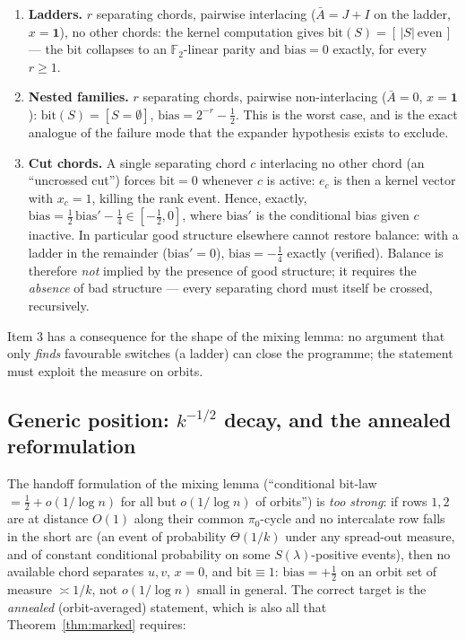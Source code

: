 \begin{enumerate}[leftmargin=2em]
\item \textbf{Ladders.}  $r$ separating chords, pairwise interlacing
($\bar A=J+I$ on the ladder, $x=\mathbf 1$), no other chords: the
kernel computation gives $\mathrm{bit}(S)=[\,|S|\ \text{even}\,]$
--- the bit collapses to an $\mathbb{F}_2$-linear parity and
$\mathrm{bias}=0$ exactly, for every $r\ge1$.
\item \textbf{Nested families.}  $r$ separating chords, pairwise
non-interlacing ($\bar A=0$, $x=\mathbf 1$):
$\mathrm{bit}(S)=[S=\emptyset]$, $\mathrm{bias}=2^{-r}-\tfrac12$.
This is the worst case, and is the exact analogue of the failure
mode that the expander hypothesis exists to exclude.
\item \textbf{Cut chords.}  A single separating chord $c$ interlacing
no other chord (an ``uncrossed cut'') forces $\mathrm{bit}=0$ whenever
$c$ is active: $e_c$ is then a kernel vector with $x_c=1$, killing the
rank event.  Hence, exactly,
$\mathrm{bias}=\tfrac12\,\mathrm{bias}'-\tfrac14\in[-\tfrac12,0]$,
where $\mathrm{bias}'$ is the conditional bias given $c$ inactive.  In
particular good structure elsewhere cannot restore balance: with a
ladder in the remainder ($\mathrm{bias}'=0$), $\mathrm{bias}=-\tfrac14$
exactly (verified).  Balance is therefore \emph{not} implied by the
presence of good structure; it requires the \emph{absence} of bad
structure --- every separating chord must itself be crossed,
recursively.
\end{enumerate}

Item 3 has a consequence for the shape of the mixing lemma: no
argument that only \emph{finds} favourable switches (a ladder) can
close the programme; the statement must exploit the measure on
orbits.

\subsection{Generic position: \texorpdfstring{$k^{-1/2}$}{k**-1/2}
decay, and the annealed reformulation}\label{sec:annealed}

The handoff formulation of the mixing lemma (``conditional bit-law
$=\frac12+o(1/\log n)$ for all but $o(1/\log n)$ of orbits'') is
\emph{too strong}: if rows $1,2$ are at distance $O(1)$ along their
common $\pi_0$-cycle and no intercalate row falls in the short arc
(an event of probability $\Theta(1/k)$ under any spread-out measure,
and of constant conditional probability on some $S(\lambda)$-positive
events), then no available chord separates $u,v$, $x=0$, and
$\mathrm{bit}\equiv1$: $\mathrm{bias}=+\tfrac12$ on an orbit set of
measure $\asymp 1/k$, not $o(1/\log n)$ small in general.  The correct
target is the \emph{annealed} (orbit-averaged) statement, which is
also all that Theorem~\ref{thm:marked} requires:

